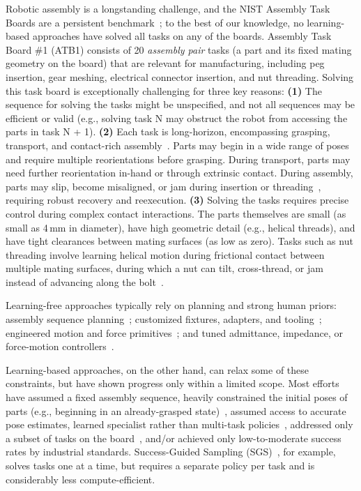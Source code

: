 Robotic assembly is a longstanding challenge, and the NIST Assembly Task Boards are a persistent benchmark~\cite{kimble2020benchmarking}; to the best of our knowledge, no learning-based approaches have solved all tasks on any of the boards. Assembly Task Board \#1 (ATB1) consists of 20 \textit{assembly pair} tasks (a part and its fixed mating geometry on the board) that are relevant for manufacturing, including peg insertion, gear meshing, electrical connector insertion, and nut threading.
Solving this task board is exceptionally challenging for three key reasons:
\textbf{(1)} The sequence for solving the tasks might be unspecified, and not all sequences may be efficient or valid (e.g., solving task N may obstruct the robot from accessing the parts in task N + 1).
\textbf{(2)} Each task is long-horizon, encompassing grasping, transport, and
contact-rich assembly~\cite{narang2022factory}.
Parts may begin in a wide range of poses and require multiple
reorientations before grasping.
During transport, parts may need further reorientation in-hand or
through extrinsic contact.
During assembly, parts may slip, become misaligned, or
jam during insertion or threading~\cite{narang2022factory}, requiring
robust recovery and reexecution.
\textbf{(3)} Solving the tasks requires precise control during complex contact interactions. The parts themselves are small (as small as 4\,mm in diameter), have high geometric detail (e.g., helical threads), and have tight clearances between mating surfaces (as low as zero).
Tasks such as nut threading involve learning helical motion during frictional contact between multiple mating surfaces, during which a nut can tilt, cross-thread, or jam instead of advancing along the bolt~\cite{narang2022factory}.

Learning-free approaches typically rely on planning and strong human priors:
assembly sequence planning~\cite{lozano1993assembly}; customized fixtures,
adapters, and tooling~\cite{kimble2020benchmarking,lian2021benchmarking}; engineered
motion and force primitives~\cite{morgan2023contact}; and tuned admittance,
impedance, or force-motion controllers~\cite{lian2021benchmarking,morgan2023contact}.

Learning-based approaches, on the other hand, can relax some of these constraints, but have shown progress only within a limited scope.
Most efforts have assumed a fixed assembly sequence, heavily constrained the initial poses of parts (e.g., beginning in an already-grasped state)~\cite{luo2021robust}, assumed access to accurate pose estimates, learned specialist rather than multi-task policies~\cite{narang2022factory}, addressed only a subset of tasks on the board~\cite{luo2021robust}, and/or achieved only low-to-moderate success rates by industrial standards.
Success-Guided Sampling (SGS)~\cite{zhang2026balanceddiet}, for example, solves tasks one at a time, but requires a separate policy per task and is considerably less compute-efficient.

